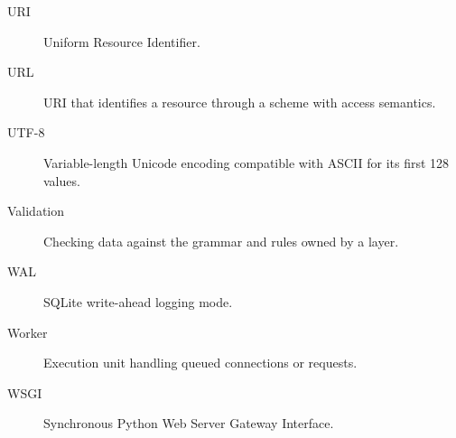 \begin{description}
\item[URI] Uniform Resource Identifier.
\item[URL] URI that identifies a resource through a scheme with access semantics.
\item[UTF-8] Variable-length Unicode encoding compatible with ASCII for its first 128 values.
\item[Validation] Checking data against the grammar and rules owned by a layer.
\item[WAL] SQLite write-ahead logging mode.
\item[Worker] Execution unit handling queued connections or requests.
\item[WSGI] Synchronous Python Web Server Gateway Interface.
\end{description}
